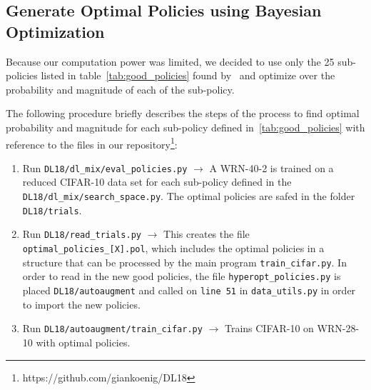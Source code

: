 \documentclass[10pt,twocolumn,letterpaper]{article}
\begin{document}

\subsection{Generate Optimal Policies using Bayesian Optimization}
Because our computation power was limited, we decided to use only the 25 sub-policies listed in table~\ref{tab:good_policies} found by~\cite{Ekin} and optimize over the probability and magnitude of each of the sub-policy.

The following procedure briefly describes the steps of the process to find optimal probability and magnitude for each sub-policy defined in~\ref{tab:good_policies} with reference to the files in our repository\footnote{https://github.com/giankoenig/DL18}:

\begin{enumerate}
\item Run \texttt{DL18/dl\_mix/eval\_policies.py} $\rightarrow$ A WRN-40-2 is trained on a reduced CIFAR-10 data set for each sub-policy defined in the \texttt{DL18/dl\_mix/search\_space.py}. The optimal policies are safed in the folder \texttt{DL18/trials}.
\item Run \texttt{DL18/read\_trials.py} $\rightarrow$ This creates the file \texttt{optimal\_policies\_[X].pol}, which includes the optimal policies in a structure that can be processed by the main program \texttt{train\_cifar.py}. In order to read in the new good policies, the file \texttt{hyperopt\_policies.py} is placed \texttt{DL18/autoaugment} and called on \texttt{line 51} in \texttt{data\_utils.py} in order to import the new policies.
\item Run \texttt{DL18/autoaugment/train\_cifar.py} $\rightarrow$  Trains CIFAR-10 on WRN-28-10 with optimal policies.
\end{enumerate}
\end{document}
